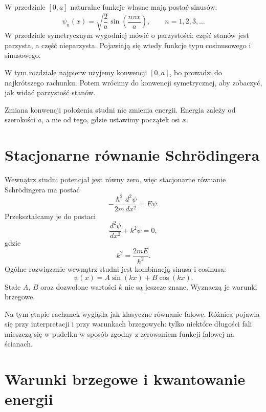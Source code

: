 W przedziale \([0,a]\) naturalne funkcje własne mają postać sinusów:
\[
\psi_n(x)=\sqrt{\frac{2}{a}}\sin\left(\frac{n\pi x}{a}\right),
\qquad n=1,2,3,\ldots
\]
W przedziale symetrycznym wygodniej mówić o parzystości: część stanów jest parzysta, a część nieparzysta. Pojawiają się wtedy funkcje typu cosinusowego i sinusowego.

W tym rozdziale najpierw użyjemy konwencji \([0,a]\), bo prowadzi do najkrótszego rachunku. Potem wrócimy do konwencji symetrycznej, aby zobaczyć, jak widać parzystość stanów.

\begin{remarkbox}
Zmiana konwencji położenia studni nie zmienia energii. Energia zależy od szerokości \(a\), a nie od tego, gdzie ustawimy początek osi \(x\).
\end{remarkbox}

\section{Stacjonarne równanie Schrödingera}

Wewnątrz studni potencjał jest równy zero, więc stacjonarne równanie Schrödingera ma postać
\begin{equation}
-\frac{\hbar^2}{2m}\frac{d^2\psi}{dx^2}=E\psi.
\end{equation}
Przekształcamy je do postaci
\begin{equation}
\frac{d^2\psi}{dx^2}+k^2\psi=0,
\end{equation}
gdzie
\begin{equation}
k^2=\frac{2mE}{\hbar^2}.
\end{equation}
Ogólne rozwiązanie wewnątrz studni jest kombinacją sinusa i cosinusa:
\begin{equation}
\psi(x)=A\sin(kx)+B\cos(kx).
\end{equation}
Stałe \(A\), \(B\) oraz dozwolone wartości \(k\) nie są jeszcze znane. Wyznaczą je warunki brzegowe.

Na tym etapie rachunek wygląda jak klasyczne równanie falowe. Różnica pojawia się przy interpretacji i przy warunkach brzegowych: tylko niektóre długości fali mieszczą się w pudełku w sposób zgodny z zerowaniem funkcji falowej na ścianach.

\section{Warunki brzegowe i kwantowanie energii}

